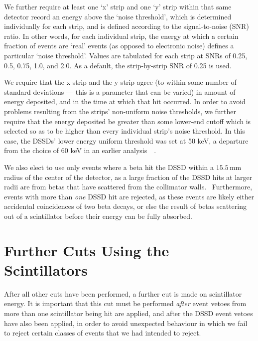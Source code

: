 	We further require at least one `x' strip and one `y' strip within that same detector record an energy above the `noise threshold', which is determined individually for each strip, and is defined according to the signal-to-noise (SNR) ratio.  In other words, for each individual strip, the energy at which a certain fraction of events are `real' events (as opposed to electronic noise) defines a particular `noise threshold'.  Values are tabulated for each strip at SNRs of 0.25, 0.5, 0.75, 1.0, and 2.0.  As a default, the strip-by-strip SNR of 0.25 is used.~  


	We require that the x strip and the y strip agree (to within some number of standard deviations --- this is a parameter that can be varied) in amount of energy deposited, and in the time at which that hit occurred.  In order to avoid problems resulting from the strips' non-uniform noise thresholds, we further require that the energy deposited be greater than some lower-end cutoff which is selected so as to be higher than every individual strip's noise threshold.  In this case, the DSSDs' lower energy uniform threshold was set at 50 keV, a departure from the choice of 60 keV in an earlier analysis~\cite{ben_Abeta}~\cite{ben_thesis}.


We also elect to use only events where a beta hit the DSSD within a $15.5\,$mm radius of the center of the detector, as a large fraction of the DSSD hits at larger radii are from betas that have scattered from the collimator walls.~ Furthermore, events with more than \emph{one} DSSD hit are rejected, as these events are likely either accidental coincidences of two beta decays, or else the result of betas scattering out of a scintillator before their energy can be fully absorbed.  



\section{Further Cuts Using the Scintillators}
After all other cuts have been performed, a further cut is made on scintillator energy.  It is important that this cut must be performed \emph{after} event vetoes from more than one scintillator being hit are applied, and after the DSSD event vetoes have also been applied, in order to avoid unexpected behaviour in which we fail to reject certain classes of events that we had intended to reject.  

